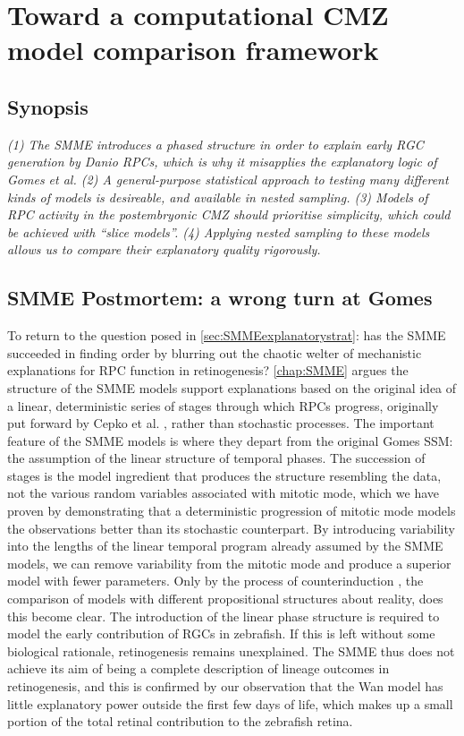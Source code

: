 \chapter{Toward a computational CMZ model comparison framework}
\label{chap:SMMEoutro}
\section*{Synopsis}
\textit{(1) The SMME introduces a phased structure in order to explain early RGC generation by \textit{Danio} RPCs, which is why it misapplies the explanatory logic of Gomes et al. \cite{Gomes2011} (2) A general-purpose statistical approach to testing many different kinds of models is desireable, and available in nested sampling. (3) Models of RPC activity in the postembryonic CMZ should prioritise simplicity, which could be achieved with ``slice models''. (4) Applying nested sampling to these models allows us to compare their explanatory quality rigorously.}

\section{SMME Postmortem: a wrong turn at Gomes}
To return to the question posed in \autoref{sec:SMMEexplanatorystrat}: has the SMME succeeded in finding order by blurring out the chaotic welter of mechanistic explanations for RPC function in retinogenesis? \autoref{chap:SMME} argues the structure of the SMME models support explanations based on the original idea of a linear, deterministic series of stages through which RPCs progress, originally put forward by Cepko et al. \cite{Cepko1996}, rather than stochastic processes. The important feature of the SMME models is where they depart from the original Gomes SSM: the assumption of the linear structure of temporal phases. The succession of stages is the model ingredient that produces the structure resembling the data, not the various random variables associated with mitotic mode, which we have proven by demonstrating that a deterministic progression of mitotic mode models the observations better than its stochastic counterpart. By introducing variability into the lengths of the linear temporal program already assumed by the SMME models, we can remove variability from the mitotic mode and produce a superior model with fewer parameters. Only by the process of counterinduction \cite{Feyerabend1993}, the comparison of models with different propositional structures about reality, does this become clear. The introduction of the linear phase structure is required to model the early contribution of RGCs in zebrafish. If this is left without some biological rationale, retinogenesis remains unexplained. The SMME thus does not achieve its aim of being a complete description of lineage outcomes in retinogenesis, and this is confirmed by our observation that the Wan model \cite{Wan2016} has little explanatory power outside the first few days of life, which makes up a small portion of the total retinal contribution to the zebrafish retina.

